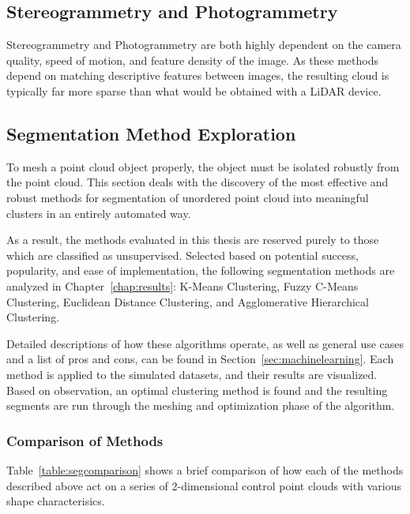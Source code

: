 \documentclass[12pt]{drexelthesis}
\let\Oldsubsection\subsection
\renewcommand{\subsection}{\FloatBarrier\Oldsubsection}
\let\Oldsubsubsection\subsubsection
\renewcommand{\subsubsection}{\FloatBarrier\Oldsubsubsection}
\begin{document}
\subsection{Stereogrammetry and Photogrammetry}
Stereogrammetry and Photogrammetry are both highly dependent on the camera quality, speed of motion, and feature density of the image. As these methods depend on matching descriptive features between images, the resulting cloud is typically far more sparse than what would be obtained with a LiDAR device.


\subsection{Segmentation Method Exploration}

To mesh a point cloud object properly, the object must be isolated robustly from the point cloud. This section deals with the discovery of the most effective and robust methods for segmentation of unordered point cloud into meaningful clusters in an entirely automated way.

As a result, the methods evaluated in this thesis are reserved purely to those which are classified as unsupervised. Selected based on potential success, popularity, and ease of implementation, the following segmentation methods are analyzed in Chapter~\ref{chap:results}: K-Means Clustering, Fuzzy C-Means Clustering, Euclidean Distance Clustering, and Agglomerative Hierarchical Clustering.

Detailed descriptions of how these algorithms operate, as well as general use cases and a list of pros and cons, can be found in Section~\ref{sec:machinelearning}. Each method is applied to the simulated datasets, and their results are visualized. Based on observation, an optimal clustering method is found and the resulting segments are run through the meshing and optimization phase of the algorithm.

\subsubsection{Comparison of Methods}

 Table~\ref{table:segcomparison} shows a brief comparison of how each of the methods described above act on a series of 2-dimensional control point clouds with various shape characterisics.
\end{document}
